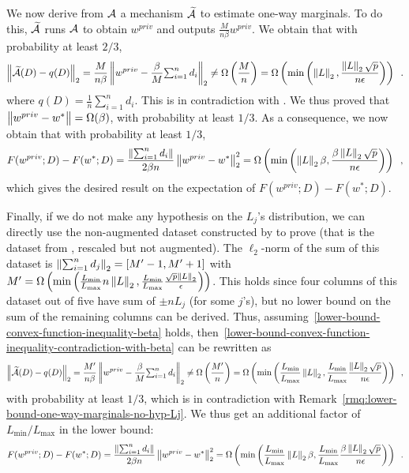 We now derive from $\mathcal A$ a mechanism $\widetilde {\mathcal A}$ to estimate one-way
marginals. To do this, $\widetilde {\mathcal A}$ runs $\mathcal A$ to obtain $w^{priv}$ and
outputs $\frac{M}{n\beta} w^{priv}$.
We obtain that with probability at least $2/3$,
\begin{align}
  \label{lower-bound-convex-function-inequality-contradiction-with-beta}
  \left \lVert \widetilde {\mathcal A}(D) - q(D) \right \rVert_2
  = \frac{M}{n\beta} \left \lVert w^{priv} - \frac{\beta}{M} \textstyle{\sum_{i=1}^n d_i} \right \rVert_2
  \not= \Omega\left(\frac{M}{n}\right)
  = \Omega\left(\min\left(\left \lVert L \right \rVert_2, \frac{\left \lVert L \right \rVert_2\sqrt{p}}{n\epsilon}\right)\right)\enspace.
\end{align}
where $q(D) = \frac{1}{n} \sum_{i=1}^n d_i$.
This is in contradiction with .
We thus proved that $\left \lVert w^{priv} - w^* \right \rVert = \Omega(\beta)$, with probability at
least $1/3$.
As a consequence, we now obtain that with probability at least $1/3$,
\begin{align}
  F(w^{priv}; D) - F(w^*; D)
  = \frac{\left \lVert \textstyle{\textstyle{\sum_{i=1}^n d_i}} \right \rVert}{2 \beta n} \left \lVert w^{priv} - w^* \right \rVert_2^2
  = \Omega\left(\min\left(\left \lVert L \right \rVert_2\beta, \frac{\beta\left \lVert L \right \rVert_2\sqrt{p}}
    {n\epsilon}\right)\right)\enspace,
\end{align}
which gives the desired result on the expectation of $F(w^{priv}; D) - F(w^*; D)$.

Finally, if we do not make any hypothesis on the $L_j$'s distribution, we
can directly use
the non-augmented dataset constructed by \citet{bun2014Fingerprinting} to prove
 (that is the dataset from
, rescaled but not augmented).
The $\ell_2$-norm of the sum of this dataset is
$\left \lVert \sum_{i=1}^n d_j \right \rVert_2 = [M' - 1, M' + 1]$ with
$M' = \Omega\left(\min\left(\frac{L_{\min}}{L_{\max}} n \left \lVert L \right \rVert_2, \frac{L_{\min}}{L_{\max}} \frac{\sqrt{p}\left \lVert L \right \rVert_2}{\epsilon} \right)\right)$.
This holds since four columns of this dataset out of five have sum of
$\pm n L_j$ (for some $j$'s), but no lower bound on the sum of the remaining
columns can be derived.
Thus, assuming~\eqref{lower-bound-convex-function-inequality-beta} holds,
then~\eqref{lower-bound-convex-function-inequality-contradiction-with-beta} can
be rewritten as
\begin{align}
  \left \lVert \widetilde {\mathcal A}(D) - q(D) \right \rVert_2
  = \frac{M'}{n\beta} \left \lVert w^{priv} - \frac{\beta}{M} \textstyle{\sum_{i=1}^n d_i} \right \rVert_2
  \not= \Omega\left(\frac{M'}{n}\right)
  = \Omega\left(\min\left(\frac{L_{\min}}{L_{\max}} \left \lVert L \right \rVert_2, \frac{L_{\min}}{L_{\max}} \frac{\left \lVert L \right \rVert_2\sqrt{p}}{n\epsilon}\right)\right)\enspace,
\end{align}
with probability at least $1/3$, which is in contradiction with
Remark~\ref{rmq:lower-bound-one-way-marginals-no-hyp-Lj}.
We thus get an additional factor of $L_{\min}/L_{\max}$ in the lower bound:
\begin{align}
  F(w^{priv}; D) - F(w^*; D)
  = \frac{\left \lVert \textstyle{\textstyle{\sum_{i=1}^n d_i}} \right \rVert}{2 \beta n} \left \lVert w^{priv} - w^* \right \rVert_2^2
  = \Omega\left(\min\left(\frac{L_{\min}}{L_{\max}}\left \lVert L \right \rVert_2\beta, \frac{L_{\min}}{L_{\max}}\frac{\beta\left \lVert L \right \rVert_2\sqrt{p}}{n\epsilon}\right)\right)\enspace.
\end{align}

